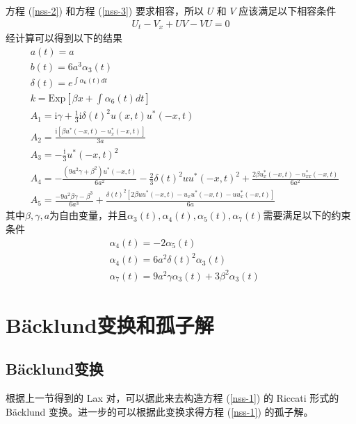 方程 (\ref{nss-2}) 和方程 (\ref{nss-3}) 要求相容，所以 $U$ 和 $V$ 应该满足以下相容条件
\begin{align}
U_{t} - V_{x} + UV - VU = 0
\end{align}
经计算可以得到以下的结果
\begin{align}
  & a(t) = a \\
  & b(t) = 6a^{3}\alpha_{3}(t) \\
  & \delta(t) = e^{\int \alpha_6(t)dt} \\
  & k =\mathrm{Exp}\left[\beta x + \int \alpha_6(t)dt \right] \\
  & A_{1} =  \mathrm{i}\gamma + \frac{1}{3}\mathrm{i}\delta(t)^2u(x,t)u^*(-x,t) \\
  & A_{2} = \frac{\mathrm{i}\left[\beta u^*(-x,t) - u^*_x(-x,t)\right]}{3a}  \\
  & A_{3} = -\frac{\mathrm{i}}{3}u^{*}(-x,t)^{2}  \\
  & A_{4} = -\frac{(9a^2\gamma+\beta^2)u^*(-x,t)}{6a^2}-\frac{2}{3}\delta(t)^2uu^*(-x,t)^2 +\frac{2\beta u^*_x(-x,t) - u^*_{xx}(-x,t)}{6a^2} \\
  & A_{5} = \frac{-9a^2\beta \gamma - \beta^3}{6a^3} + \frac{\delta(t)^2\left[2\beta uu^*(-x,t) - u_xu^*(-x,t) - uu^*_x(-x,t)\right]}{6a}
\end{align}
其中$\beta, \gamma, a$为自由变量，并且$\alpha_{3}(t), \alpha_{4}(t), \alpha_5(t), \alpha_{7}(t)$需要满足以下的约束条件
\begin{align}
  & \alpha_4(t) = -2\alpha_5(t) \\
  & \alpha_{4}(t) = 6a^{2}\delta(t)^{2}\alpha_{3}(t) \\
  & \alpha_{7}(t) = 9a^2\gamma\alpha_3(t) + 3\beta^2\alpha_3(t)
\end{align}

\section{B\"acklund变换和孤子解}
\subsection{B\"acklund变换}
根据上一节得到的 Lax 对，可以据此来去构造方程 (\ref{nss-1}) 的 Riccati 形式的 B\"acklund 变换。进一步的可以根据此变换求得方程 (\ref{nss-1}) 的孤子解。

